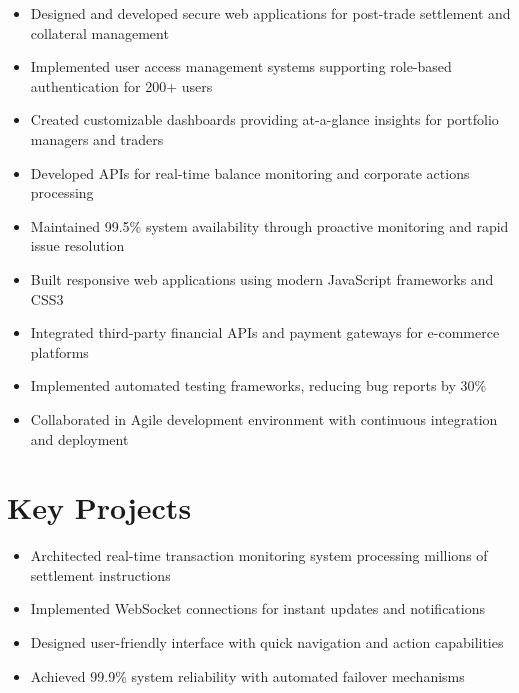 \documentclass[11pt,a4paper,sans]{moderncv}
\begin{document}
{
\begin{itemize}[leftmargin=*]
\item Designed and developed secure web applications for post-trade settlement and collateral management
\item Implemented user access management systems supporting role-based authentication for 200+ users
\item Created customizable dashboards providing at-a-glance insights for portfolio managers and traders
\item Developed APIs for real-time balance monitoring and corporate actions processing
\item Maintained 99.5\% system availability through proactive monitoring and rapid issue resolution
\end{itemize}
}

{
\begin{itemize}[leftmargin=*]
\item Built responsive web applications using modern JavaScript frameworks and CSS3
\item Integrated third-party financial APIs and payment gateways for e-commerce platforms
\item Implemented automated testing frameworks, reducing bug reports by 30\%
\item Collaborated in Agile development environment with continuous integration and deployment
\end{itemize}
}

\section{Key Projects}

{
\begin{itemize}[leftmargin=*]
\item Architected real-time transaction monitoring system processing millions of settlement instructions
\item Implemented WebSocket connections for instant updates and notifications
\item Designed user-friendly interface with quick navigation and action capabilities
\item Achieved 99.9\% system reliability with automated failover mechanisms
\end{itemize}
}
\end{document}
